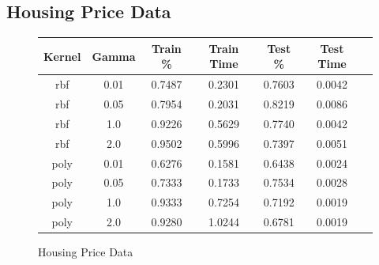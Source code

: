\documentclass[h]{article}
\begin{document}
\subsection*{Housing Price Data}

\begin{figure}[H]
\begin{tabular}{ | c | c  | c | c | c | c | c |} 
\hline
\textbf{Kernel} & \textbf{Gamma} & \textbf{Train \%} & \textbf{Train Time} & \textbf{Test \%} & \textbf{Test Time}   \\ \hline
rbf & 0.01 & 0.7487 & 0.2301 & 0.7603 & 0.0042 \\ \hline
rbf & 0.05 & 0.7954 & 0.2031 & 0.8219 & 0.0086 \\ \hline
rbf & 1.0 & 0.9226 & 0.5629 & 0.7740 & 0.0042 \\ \hline
rbf & 2.0 & 0.9502 & 0.5996 & 0.7397 & 0.0051 \\ \hline
poly & 0.01 & 0.6276 & 0.1581 & 0.6438 & 0.0024 \\ \hline
poly & 0.05 & 0.7333 & 0.1733 & 0.7534 & 0.0028 \\ \hline
poly & 1.0 & 0.9333 & 0.7254 & 0.7192 & 0.0019 \\ \hline
poly & 2.0 & 0.9280 & 1.0244 & 0.6781 & 0.0019 \\ \hline


\hline
\end{tabular}
\caption*{Housing Price Data}
\endminipage\hfill
\end{figure}
\end{document}
